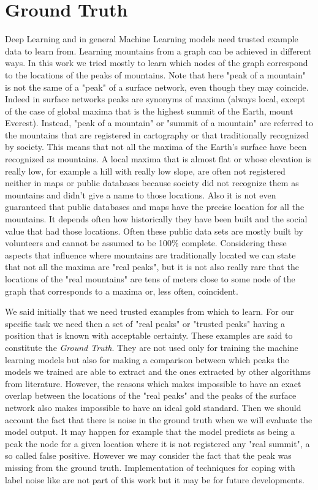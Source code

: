 \section{Ground Truth}
Deep Learning and in general Machine Learning models need trusted example data to learn from. Learning mountains from a graph can be achieved in different ways. In this work we tried mostly to learn which nodes of the graph correspond to the locations of the peaks of mountains. Note that here "peak of a mountain" is not the same of a "peak" of a surface network, even though they may coincide. Indeed in surface networks peaks are synonyms of maxima (always local, except of the case of global maxima that is the highest summit of the Earth, mount Everest). Instead, "peak of a mountain" or "summit of a mountain" are referred to the mountains that are registered in cartography or that traditionally recognized by society. This means that not all the maxima of the Earth's surface have been recognized as mountains. A local maxima that is almost flat or whose elevation is really low, for example a hill with really low slope, are often not registered neither in maps or public databases because society did not recognize them as mountains and didn't give a name to those locations. Also it is not even guaranteed that public databases and maps have the precise location for all the mountains. It depends often how historically they have been built and the social value that had those locations. Often these public data sets are mostly built by volunteers and cannot be assumed to be 100\% complete. Considering these aspects that influence where mountains are traditionally located we can state that not all the maxima are "real peaks", but it is not also really rare that the locations of the "real mountains" are tens of meters close to some node of the graph that corresponds to a maxima or, less often, coincident.

We said initially that we need trusted examples from which to learn. For our specific task we need then a set of "real peaks" or "trusted peaks" having a position that is known with acceptable certainty. These examples are said to constitute the \textit{Ground Truth}. They are not used only for training the machine learning models but also for making a comparison between which peaks the models we trained are able to extract and the ones extracted by other algorithms from literature. However, the reasons which makes impossible to have an exact overlap between the locations of the "real peaks" and the peaks of the surface network also makes impossible to have an ideal gold standard. Then we should account the fact that there is noise in the ground truth when we will evaluate the model output. It may happen for example that the model predicts as being a peak the node for a given location where it is not registered any "real summit", a so called false positive. However we may consider the fact that the peak was missing from the ground truth. Implementation of techniques for coping with label noise like \cite{FrenayV14} are not part of this work but it may be for future developments.

